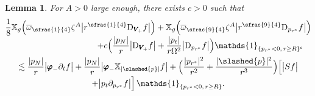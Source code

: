 \documentclass[JEP,XML,SOM,Unicode,published]{cedram}
\theoremstyle{plain}
\newtheorem{lemma}[proposition]{Lemma}
\theoremstyle{definition}
\newcommand\z{{\zeta}}
\newcommand\T{{\mathbb{X}}}
\begin{document}
\begin{lemma}\label{LemforProestivarphiminusVminus}
For $A>0$ large enough, there exists $c>0$ such that\vspace*{-5pt}
\begin{multline*}
\frac{1}{8}\T_g \Bigl(\overline{\omega}_{\sfrac{1}{4}} \z^A \big| r^{\sfrac{1}{4}}\mathrm{D}_{\pmb{V}_{\!+}} f \big| \Bigr) +\T_g \Bigl(\overline{\omega}_{\sfrac{9}{4}} \z^A \big| r^{\sfrac{9}{4}} \mathrm{D }_{p_{r^*}} f \big| \Bigr) \\[-3pt]
\shoveright{+c\Bigl(\frac{|p_N|}{r } \big|\mathrm{D}_{\pmb{V}_{\!+}} f \big|+\frac{|p_t|}{r \Omega^2} \big| \mathrm{D }_{p_{r^*}} f \big| \Bigr) \mathds{1}_{\{p_{r^*} <0, \, r \geq R\}^\mathsf{c}}}\\
\lesssim \frac{|p_N|}{r} \big| \pmb{\varphi}_- \partial_t f \big| +\frac{|p_N|}{r} \big| \pmb{\varphi}_- \T_{|\slashed{p}|} f \big| + \Bigl(\frac{|p_{r^*}|^2}{r^2 }+ \frac{|\slashed{p}|^2}{r^3 } \Bigr)\Bigl[\big|Sf\big|\\[-2pt]
+ \big|p_t \partial_{p_{r^*}} f\big| \Bigr]\, \mathds{1}_{\{p_{r^*} <0, \, r \geq R\}}.
\end{multline*}
\end{lemma}
\end{document}
